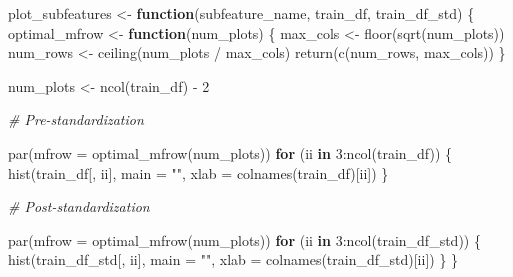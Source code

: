 \documentclass[
]{article}
\newenvironment{Shaded}{\begin{snugshade}}{\end{snugshade}}
\newcommand{\AttributeTok}[1]{\textcolor[rgb]{0.77,0.63,0.00}{#1}}
\newcommand{\CommentTok}[1]{\textcolor[rgb]{0.56,0.35,0.01}{\textit{#1}}}
\newcommand{\ControlFlowTok}[1]{\textcolor[rgb]{0.13,0.29,0.53}{\textbf{#1}}}
\newcommand{\DecValTok}[1]{\textcolor[rgb]{0.00,0.00,0.81}{#1}}
\newcommand{\FunctionTok}[1]{\textcolor[rgb]{0.00,0.00,0.00}{#1}}
\newcommand{\NormalTok}[1]{#1}
\newcommand{\OtherTok}[1]{\textcolor[rgb]{0.56,0.35,0.01}{#1}}
\newcommand{\SpecialCharTok}[1]{\textcolor[rgb]{0.00,0.00,0.00}{#1}}
\newcommand{\StringTok}[1]{\textcolor[rgb]{0.31,0.60,0.02}{#1}}
\begin{document}
\begin{Shaded}
\begin{Highlighting}[]
\NormalTok{plot\_subfeatures }\OtherTok{\textless{}{-}} \ControlFlowTok{function}\NormalTok{(subfeature\_name, train\_df, train\_df\_std) \{}
\NormalTok{  optimal\_mfrow }\OtherTok{\textless{}{-}} \ControlFlowTok{function}\NormalTok{(num\_plots) \{}
\NormalTok{    max\_cols }\OtherTok{\textless{}{-}} \FunctionTok{floor}\NormalTok{(}\FunctionTok{sqrt}\NormalTok{(num\_plots))}
\NormalTok{    num\_rows }\OtherTok{\textless{}{-}} \FunctionTok{ceiling}\NormalTok{(num\_plots }\SpecialCharTok{/}\NormalTok{ max\_cols)}
    \FunctionTok{return}\NormalTok{(}\FunctionTok{c}\NormalTok{(num\_rows, max\_cols))}
\NormalTok{  \}}

\NormalTok{  num\_plots }\OtherTok{\textless{}{-}} \FunctionTok{ncol}\NormalTok{(train\_df) }\SpecialCharTok{{-}} \DecValTok{2}

  \CommentTok{\# Pre{-}standardization}

  \FunctionTok{par}\NormalTok{(}\AttributeTok{mfrow =} \FunctionTok{optimal\_mfrow}\NormalTok{(num\_plots))}
  \ControlFlowTok{for}\NormalTok{ (ii }\ControlFlowTok{in} \DecValTok{3}\SpecialCharTok{:}\FunctionTok{ncol}\NormalTok{(train\_df)) \{}
    \FunctionTok{hist}\NormalTok{(train\_df[, ii], }\AttributeTok{main =} \StringTok{""}\NormalTok{, }\AttributeTok{xlab =} \FunctionTok{colnames}\NormalTok{(train\_df)[ii])}
\NormalTok{  \}}

  \CommentTok{\# Post{-}standardization}

  \FunctionTok{par}\NormalTok{(}\AttributeTok{mfrow =} \FunctionTok{optimal\_mfrow}\NormalTok{(num\_plots))}
  \ControlFlowTok{for}\NormalTok{ (ii }\ControlFlowTok{in} \DecValTok{3}\SpecialCharTok{:}\FunctionTok{ncol}\NormalTok{(train\_df\_std)) \{}
    \FunctionTok{hist}\NormalTok{(train\_df\_std[, ii], }\AttributeTok{main =} \StringTok{""}\NormalTok{, }\AttributeTok{xlab =} \FunctionTok{colnames}\NormalTok{(train\_df\_std)[ii])}
\NormalTok{  \}}
\NormalTok{\}}
\end{Highlighting}
\end{Shaded}
\end{document}
